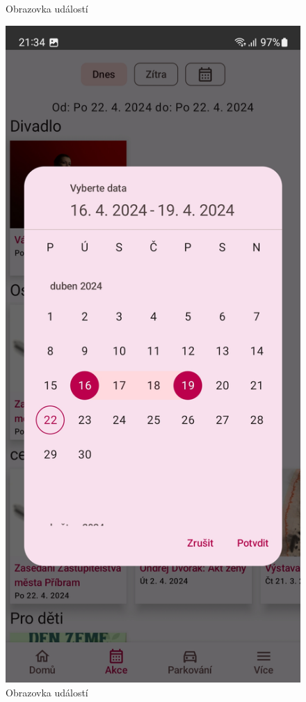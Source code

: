 \begin{figure}[H]
    \caption{Obrazovka událostí}
  \endminipage\hfill
    \includegraphics[width=\linewidth]{screens/2b.jpg}
    \caption{Obrazovka událostí}
  \endminipage\hfill
\end{figure}

